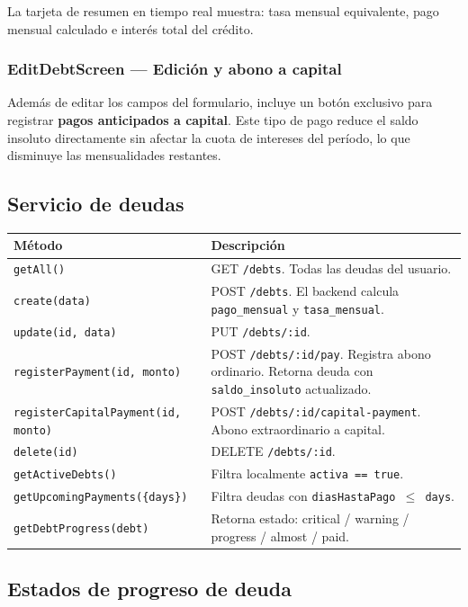 \documentclass[12pt, letterpaper]{article}
\newcommand{\endpoint}[1]{\texttt{\small\color{azulipn}#1}}
\newcommand{\campo}[1]{\texttt{#1}}
\begin{document}
La tarjeta de resumen en tiempo real muestra: tasa mensual equivalente,
pago mensual calculado e interés total del crédito.

\subsubsection{EditDebtScreen — Edición y abono a capital}

Además de editar los campos del formulario, incluye un botón exclusivo para
registrar \textbf{pagos anticipados a capital}. Este tipo de pago reduce el
saldo insoluto directamente sin afectar la cuota de intereses del período,
lo que disminuye las mensualidades restantes.

\subsection{Servicio de deudas}

\begin{tabular}{lp{8.5cm}}
  \toprule
  \textbf{Método} & \textbf{Descripción} \\
  \midrule
  \campo{getAll()} &
    GET \endpoint{/debts}. Todas las deudas del usuario. \\
  \campo{create(data)} &
    POST \endpoint{/debts}. El backend calcula \campo{pago\_mensual} y
    \campo{tasa\_mensual}. \\
  \campo{update(id, data)} &
    PUT \endpoint{/debts/:id}. \\
  \campo{registerPayment(id, monto)} &
    POST \endpoint{/debts/:id/pay}. Registra abono ordinario.
    Retorna deuda con \campo{saldo\_insoluto} actualizado. \\
  \campo{registerCapitalPayment(id, monto)} &
    POST \endpoint{/debts/:id/capital-payment}. Abono extraordinario
    a capital. \\
  \campo{delete(id)} &
    DELETE \endpoint{/debts/:id}. \\
  \campo{getActiveDebts()} &
    Filtra localmente \campo{activa == true}. \\
  \campo{getUpcomingPayments(\{days\})} &
    Filtra deudas con \campo{diasHastaPago $\leq$ days}. \\
  \campo{getDebtProgress(debt)} &
    Retorna estado: critical / warning / progress / almost / paid. \\
  \bottomrule
\end{tabular}

\subsection{Estados de progreso de deuda}
\end{document}
